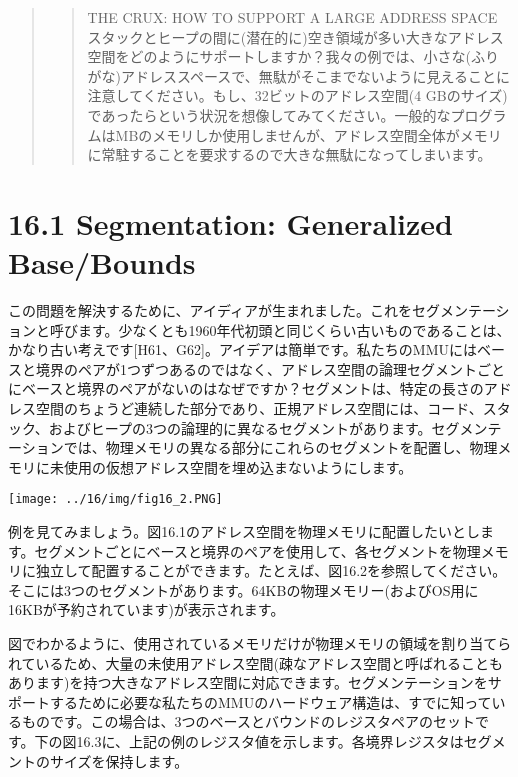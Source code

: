 \begin{quote}
\begin{quote}
THE CRUX: HOW TO SUPPORT A LARGE ADDRESS SPACE\\
スタックとヒープの間に(潜在的に)空き領域が多い大きなアドレス空間をどのようにサポートしますか？我々の例では、小さな(ふりがな)アドレススペースで、無駄がそこまでないように見えることに注意してください。もし、32ビットのアドレス空間(4
GBのサイズ)であったらという状況を想像してみてください。一般的なプログラムはMBのメモリしか使用しませんが、アドレス空間全体がメモリに常駐することを要求するので大きな無駄になってしまいます。
\end{quote}
\end{quote}

\hypertarget{segmentation-generalized-basebounds}{%
\section*{16.1 Segmentation: Generalized
Base/Bounds}\label{segmentation-generalized-basebounds}}

この問題を解決するために、アイディアが生まれました。これをセグメンテーションと呼びます。少なくとも1960年代初頭と同じくらい古いものであることは、かなり古い考えです{[}H61、G62{]}。アイデアは簡単です。私たちのMMUにはベースと境界のペアが1つずつあるのではなく、アドレス空間の論理セグメントごとにベースと境界のペアがないのはなぜですか？セグメントは、特定の長さのアドレス空間のちょうど連続した部分であり、正規アドレス空間には、コード、スタック、およびヒープの3つの論理的に異なるセグメントがあります。セグメンテーションでは、物理メモリの異なる部分にこれらのセグメントを配置し、物理メモリに未使用の仮想アドレス空間を埋め込まないようにします。

\texttt{[image: ../16/img/fig16\_2.PNG]}

例を見てみましょう。図16.1のアドレス空間を物理メモリに配置したいとします。セグメントごとにベースと境界のペアを使用して、各セグメントを物理メモリに独立して配置することができます。たとえば、図16.2を参照してください。そこには3つのセグメントがあります。64KBの物理メモリー(およびOS用に16KBが予約されています)が表示されます。

図でわかるように、使用されているメモリだけが物理メモリの領域を割り当てられているため、大量の未使用アドレス空間(疎なアドレス空間と呼ばれることもあります)を持つ大きなアドレス空間に対応できます。セグメンテーションをサポートするために必要な私たちのMMUのハードウェア構造は、すでに知っているものです。この場合は、3つのベースとバウンドのレジスタペアのセットです。下の図16.3に、上記の例のレジスタ値を示します。各境界レジスタはセグメントのサイズを保持します。

